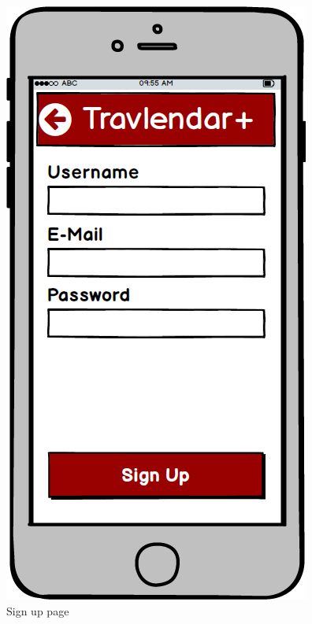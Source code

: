 \begin{figure}[!htb]
\begin{minipage}[b]{0.4\textwidth}
	\includegraphics[scale=0.3]{images/sign-up}
	\caption{Sign up page}
	\label{ref:signup}
\end{minipage}
\end{figure}


